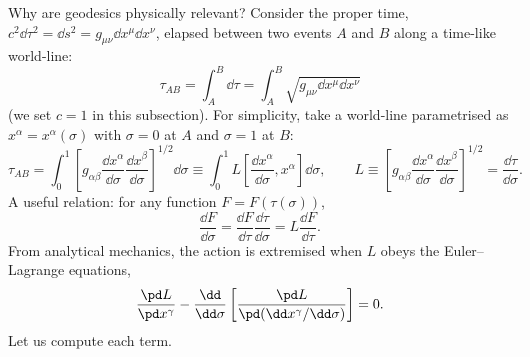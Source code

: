 Why are geodesics physically relevant? Consider the proper time, $c^2\dd\tau^2=\dd s^2=g_{\mu\nu}\dd x^\mu\dd x^\nu$, elapsed between two events $A$ and $B$ along a time-like world-line:
\begin{equation}
  \tau_{AB}=\int_A^B\dd\tau=\int_A^B\sqrt{g_{\mu\nu}\dd x^\mu\dd x^\nu}
\end{equation}
(we set $c=1$ in this subsection). For simplicity, take a world-line parametrised as $x^\alpha=x^\alpha(\sigma)$ with $\sigma=0$ at $A$ and $\sigma=1$ at $B$:
\[
  \tau_{AB}=\int_0^1\left[g_{\alpha\beta}\frac{\dd x^\alpha}{\dd\sigma}\frac{\dd x^\beta}{\dd\sigma}\right]^{1/2}\dd\sigma\equiv\int_0^1 L\!\left[\frac{\dd x^\alpha}{\dd\sigma},x^\alpha\right]\dd\sigma ,
  \qquad L\equiv\left[g_{\alpha\beta}\frac{\dd x^\alpha}{\dd\sigma}\frac{\dd x^\beta}{\dd\sigma}\right]^{1/2}=\frac{\dd\tau}{\dd\sigma}.
\]
A useful relation: for any function $F=F(\tau(\sigma))$,
\begin{equation}
  \frac{\dd F}{\dd\sigma}=\frac{\dd F}{\dd\tau}\frac{\dd\tau}{\dd\sigma}=L\frac{\dd F}{\dd\tau}.\tag{$\ast$}
\end{equation}
From analytical mechanics, the action is extremised when $L$ obeys the Euler--Lagrange equations,
\[
  \frac{\pd L}{\pd x^\gamma}-\frac{\dd}{\dd\sigma}\left[\frac{\pd L}{\pd(\dd x^\gamma/\dd\sigma)}\right]=0 .
\]
Let us compute each term.
